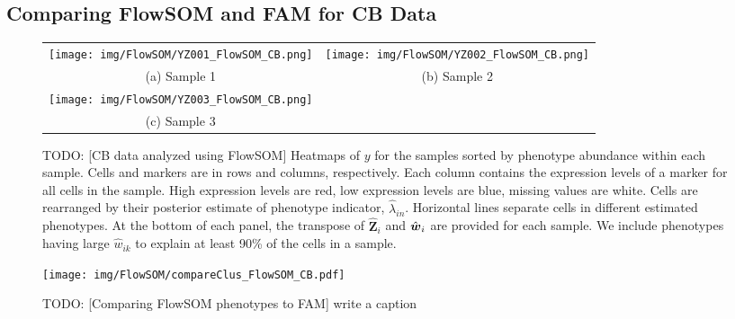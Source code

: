 \documentclass[12pt,]{article}
\def\Z{\bm{Z}}
\newcommand{\bw}{\mbox{\boldmath $w$}}
\begin{document}
\subsection{Comparing FlowSOM and FAM for CB Data}
\begin{figure}[H]
\begin{center}
  \begin{tabular}{cc}
  \texttt{[image: img/FlowSOM/YZ001\_FlowSOM\_CB.png]}&
  \texttt{[image: img/FlowSOM/YZ002\_FlowSOM\_CB.png]}\\
  (a) Sample 1 & (b) Sample 2 \\
  \texttt{[image: img/FlowSOM/YZ003\_FlowSOM\_CB.png]} &\\
  (c) Sample 3 & \\
  \end{tabular}
\end{center}
\vspace{-0.05in}
\caption{TODO: [CB data analyzed using FlowSOM]  Heatmaps of $y$ for the samples
  sorted by phenotype abundance within each sample. Cells and markers are in
  rows and columns, respectively. Each column contains the expression levels of
  a marker for all cells in the sample. High expression levels are red, low
  expression levels are blue, missing values are white.  Cells are rearranged
  by their posterior estimate of phenotype indicator, $\hat{\lambda}_{in}$.
  Horizontal lines separate cells in different estimated phenotypes.  At the
  bottom of each panel, the transpose of $\hat{\Z}_i$ and $\hat{\bw}_i$ are
  provided for each sample. We include phenotypes having large $\hat{w}_{ik}$
  to explain at least 90\% of the cells in a sample.}
\label{fig:fs-post-Z}
\end{figure}

\begin{figure}
\begin{center}
\texttt{[image: img/FlowSOM/compareClus\_FlowSOM\_CB.pdf]}
\caption{TODO: [Comparing FlowSOM phenotypes to FAM] write a caption}
\label{fig:fs-fam-compare}
\end{center}
\end{figure}





\end{document}
